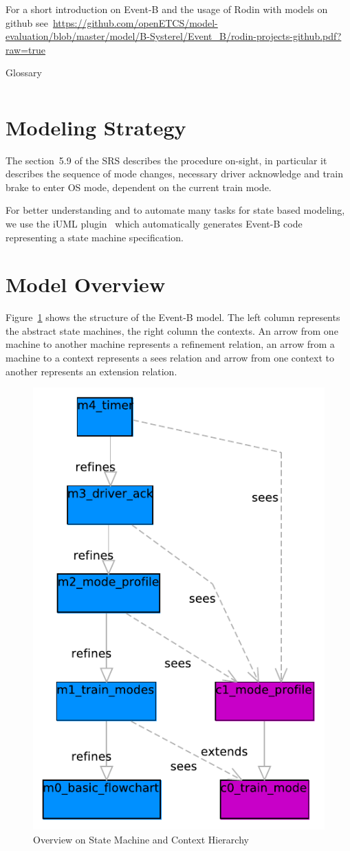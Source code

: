\documentclass{template/openetcs_article}
\begin{document}
For a short introduction on Event-B and the usage of Rodin with models on github
see~\url{https://github.com/openETCS/model-evaluation/blob/master/model/B-Systerel/Event_B/rodin-projects-github.pdf?raw=true}

\begin{table}[ht]
  \centering
  \begin{tabular}[ht]{|l|l|}
    \hline
    \hline
  \end{tabular}
  \caption{Glossary}
  \label{tab:glossary}
\end{table}

\section{Modeling Strategy}
\label{sec:modeling-strategy}

The section~5.9 of the SRS describes the procedure on-sight, in particular it
describes the sequence of mode changes, necessary driver acknowledge and train
brake to enter OS mode, dependent on the current train mode.

For better understanding and to automate many tasks for state based modeling, we
use the iUML plugin~\cite{UML-plugin} which automatically generates Event-B code
representing a state machine specification.

\section{Model Overview}
\label{sec:model-overview}

Figure~\ref{fig:model-overview} shows the structure of the Event-B model. The
left column represents the abstract state machines, the right column the
contexts. An arrow from one machine to another machine represents a refinement
relation, an arrow from a machine to a context represents a sees relation and
arrow from one context to another represents an extension relation.

\begin{figure}[ht]
  \centering
  \includegraphics[width=.3\textwidth]{SubSet_026_5_9}
  \caption{Overview on State Machine and Context Hierarchy}
  \label{fig:model-overview}
\end{figure}
\end{document}
